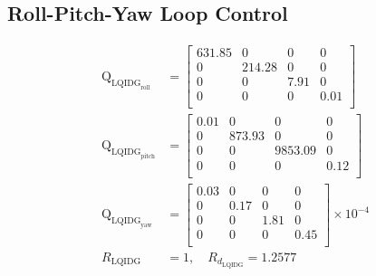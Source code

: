 \documentclass[conference]{IEEEtran}
\begin{document}
\subsection{Roll-Pitch-Yaw Loop Control}
\begin{equation}
	\begin{split}
		\boldsymbol{\mathrm{Q}}_{{\text{LQIDG}_{\text{roll}}}} &= \begin{bmatrix}
			631.85 & 0 & 0 & 0  \\ 
			0 & 214.28 & 0 & 0  \\ 
			0 & 0 & 7.91 & 0  \\ 
			0 & 0 & 0 & 0.01  \\ 
		\end{bmatrix} \\[1em]
		\boldsymbol{\mathrm{Q}}_{{\text{LQIDG}_{\text{pitch}}}} &= \begin{bmatrix}
			0.01 & 0 & 0 & 0  \\
			0 & 873.93 & 0 & 0  \\ 
			0 & 0 & 9853.09 & 0 \\ 
			0 & 0 & 0 & 0.12  \\ 
		\end{bmatrix}\\[1em]
		\boldsymbol{\mathrm{Q}}_{{\text{LQIDG}_{\text{yaw}}}}  &= \begin{bmatrix}
			0.03 & 0 & 0 & 0 \\ 
			0 & 0.17 & 0 & 0 \\ 
			0 & 0 & 1.81 & 0 \\ 
			0 & 0 & 0 & 0.45 \\
		\end{bmatrix}\times 10^{-4}\\[1em]
          R_{{\text{LQIDG}}} &= 1, \quad  R_{d_{\text{LQIDG}}} = 1.2577
	\end{split}
\end{equation}
\end{document}
